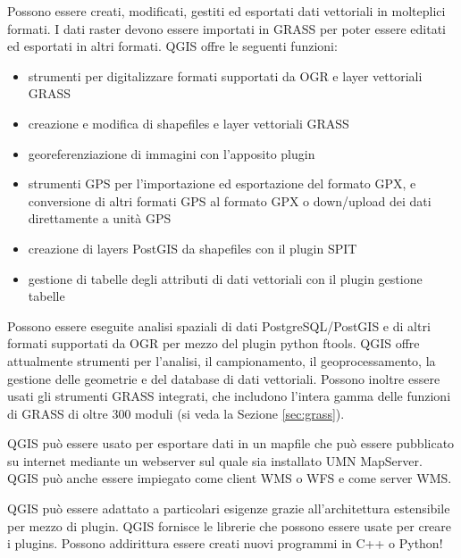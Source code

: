 
Possono essere creati, modificati, gestiti ed esportati dati vettoriali
in molteplici formati. I dati raster devono essere importati in GRASS
per poter essere editati ed esportati in altri formati. QGIS offre
le seguenti funzioni:
\begin{itemize}
\item strumenti per digitalizzare formati supportati da OGR e layer vettoriali GRASS
\item creazione e modifica di shapefiles e layer vettoriali GRASS 
\item georeferenziazione di immagini con l'apposito plugin 
\item strumenti GPS per l'importazione ed esportazione del formato GPX, e conversione di altri formati GPS al formato GPX o down/upload dei dati direttamente a unità GPS
\item creazione di layers PostGIS da shapefiles con il plugin SPIT 
\item gestione di tabelle degli attributi di dati vettoriali con il plugin gestione tabelle
\end{itemize}


Possono essere eseguite analisi spaziali di dati PostgreSQL/PostGIS e di altri
formati supportati da OGR per mezzo del plugin python ftools. QGIS
offre attualmente strumenti per l'analisi, il campionamento, il geoprocessamento,
la gestione delle geometrie e del database di dati vettoriali. Possono
inoltre essere usati gli strumenti GRASS integrati, che includono
l'intera gamma delle funzioni di GRASS di oltre 300 moduli (si veda la Sezione \ref{sec:grass}).


QGIS può essere usato per esportare dati in un mapfile che può essere
pubblicato su internet mediante un webserver sul quale sia installato
UMN MapServer. QGIS può anche essere impiegato come client WMS o
WFS e come server WMS. 


QGIS può essere adattato a particolari esigenze grazie all'architettura
estensibile per mezzo di plugin. QGIS fornisce le librerie che possono
essere usate per creare i plugins. Possono addirittura essere creati
nuovi programmi in C++ o Python!


